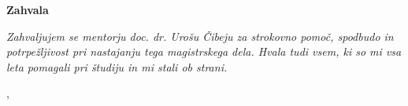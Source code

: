 \thispagestyle{empty}

\begin{center}
{\Large \textbf{\sc Zahvala}}
\end{center}
\vspace{0.5cm}

{\it\noindent
Zahvaljujem se mentorju doc. dr. Urošu Čibeju za strokovno pomoč, spodbudo in potrpežljivost pri nastajanju tega magistrskega dela. Hvala tudi vsem, ki so mi vsa leta pomagali pri študiju in mi stali ob strani.

\vspace{0.5cm} \hfill \tauthor, \myyear
}